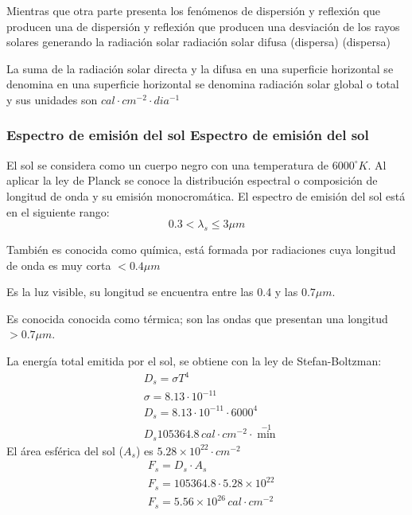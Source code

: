 Mientras que otra parte presenta los fenómenos de dispersión y reflexión que producen una de dispersión y reflexión que producen una desviación de los rayos solares generando la radiación solar radiación solar difusa (dispersa) (dispersa)

La suma de la radiación solar directa y la difusa en una superficie horizontal se denomina en una superficie horizontal se denomina radiación solar global o total y sus unidades son $cal\cdot cm^{-2}\cdot  dia^{-1}$

\subsubsection{Espectro de emisión del sol Espectro de emisión del sol}
El sol se considera como un cuerpo negro
con una temperatura de $6000^{\circ}K$. Al aplicar la ley de Planck se conoce la distribución espectral o composición de longitud de onda y su emisión
monocromática. El espectro de emisión del sol está en el siguiente rango:
\begin{equation}
    0.3 <\lambda_s\leq 3\mu m
\end{equation}
\begin{definition}
    También es conocida como química, está formada por radiaciones cuya longitud de onda es muy corta $< 0.4 \mu m$
\end{definition}
\begin{definition}
    Es la luz visible, su longitud se encuentra entre las 0.4 y las $0.7 \mu m$.
\end{definition}
\begin{definition}
    Es conocida conocida como térmica; son las ondas que presentan una longitud $> 0.7 \mu m$.
\end{definition}
La energía total emitida por el sol, se obtiene con la ley de Stefan-Boltzman:
\begin{align}
    &D_s = \sigma T^4\\
    &\sigma = 8.13\cdot 10^{ - 11}\\
    &D_s = 8.13\cdot 10^{ -11}\cdot 6000^4\\
    &D_s 105364.8\, cal\cdot cm^{ - 2}\cdot \min^{ - 1}
\end{align}
El área esférica del sol ($A_s$) es $5.28\times 10^{22}\cdot cm^{ - 2}$
\begin{align}
    &F_s = D_s\cdot A_s\\
    &F_s = 105364.8\cdot 5.28\times 10^{22}\\
    &F_s = 5.56\times 10^{26}\, cal\cdot cm^{ - 2}
\end{align}
